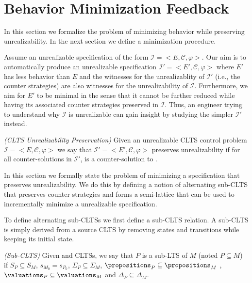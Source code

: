 \section{Behavior Minimization Feedback}\label{sec:problemStatement}

In this section we formalize the problem of minimizing behavior while preserving unrealizability. In the next section we define a minimization procedure.

Assume an unrealizable specification of the form $\mathcal{I} = <E, \mathcal{C}, \varphi>$. Our aim is to automatically produce an unrealizable specification $\mathcal{I'} = <E', \mathcal{C}, \varphi>$ where $E'$ has less behavior than $E$ and the witnesses for the unrealizablity of $\mathcal{I'}$ (i.e., the counter strategies) are also witnesses for the unrealizability of $\mathcal{I}$.  Furthermore, we aim for $E'$ to be minimal in the sense that it cannot be further reduced while having its associated counter strategies preserved in  $\mathcal{I}$.
Thus, an engineer trying to understand why $\mathcal{I}$ is unrealizable can gain insight by studying the simpler $\mathcal{I'}$ instead. 


\begin{definition}\label{}\emph{(CLTS Unrealizability Preservation)}
	Given an unrealizable CLTS control problem $\mathcal{I} = <E, \mathcal{C}, \varphi>$ we say
	that $\mathcal{I'} = <E', \mathcal{C}, \varphi>$ preserves unrealizability
	if for all counter-solutions \advCtrl in $\mathcal{I'}$, \advCtrl is a counter-solution to \controlProblem.
\end{definition}


In this section we formally state the problem of minimizing a specification that preserves unrealizability. We do this by defining a notion of alternating sub-CLTS that preserves counter strategies and forms a semi-lattice that can be used to incrementally minimize a unrealizable specification. 

To define alternating sub-CLTSs we first define a sub-CLTS relation.  A sub-CLTS is simply derived from a source CLTS by removing states and transitions while keeping its initial state.

\begin{definition}\label{def:clts-inclusion}\emph{(Sub-CLTS)}
	Given  and
	 CLTSs, 
	we say that $P$ is a sub-LTS of $M$ (noted $P \subseteq M$) if $S_P \subseteq S_M$,
	$s_{M_0} = s_{P_0}$, $\Sigma_P \subseteq \Sigma_M$, $\propositions_P \subseteq \propositions_M$ , $\valuations_P \subseteq \valuations_M$ and $\Delta_P \subseteq \Delta_M$.
\end{definition}


